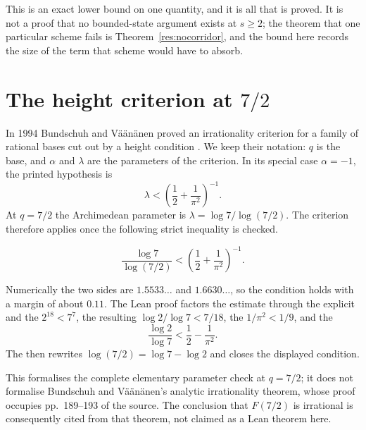 \documentclass[11pt]{article}
\begin{document}
This is an
exact lower bound on one quantity, and it is all that is proved.  It is not a
proof that no bounded-state argument exists at $s\ge2$; the theorem that one
particular scheme fails is Theorem~\ref{res:nocorridor}, and the bound here
records the size of the term that scheme would have to absorb.

\section{The height criterion at $7/2$}\label{sec:sevenhalves}

In 1994 Bundschuh and V\"a\"an\"anen proved an irrationality criterion for a
family of rational bases cut out by a height condition
\cite[Theorem~2, p.~177; hypotheses pp.~175--176]{bv1994}.  We keep their
notation: $q$ is the base, and $\alpha$
and $\lambda$ are the parameters of the criterion.  In its special case
$\alpha=-1$, the printed hypothesis is
\[
 \lambda<\left(\frac12+\frac1{\pi^2}\right)^{-1}.
\]
At $q=7/2$ the Archimedean parameter is
$\lambda=\log 7/\log(7/2)$.  The criterion therefore applies once the following
strict inequality is checked.

\begin{theorem}\label{res:sevenhalves}
\[
 \frac{\log 7}{\log(7/2)}
 <
 \left(\frac12+\frac1{\pi^2}\right)^{-1}.
\]
\end{theorem}

\noindent Numerically the two sides are $1.5533\ldots$ and $1.6630\ldots$, so
the condition holds with a margin of about $0.11$.  The Lean proof factors the
estimate through the explicit
 and the
 $2^{18}<7^7$, the resulting
 $\log2/\log7<7/18$, the
$1/\pi^2<1/9$, and the
\[
 \frac{\log2}{\log7}<\frac12-\frac1{\pi^2}.
\]
The
 then rewrites
$\log(7/2)=\log7-\log2$ and closes the displayed condition.

This formalises the complete elementary parameter check at $q=7/2$; it does
not formalise Bundschuh and V\"a\"an\"anen's analytic irrationality theorem,
whose proof occupies pp.~189--193 of the source.  The conclusion that
$F(7/2)$ is irrational is consequently cited from that theorem, not claimed as
a Lean theorem here.
\end{document}
